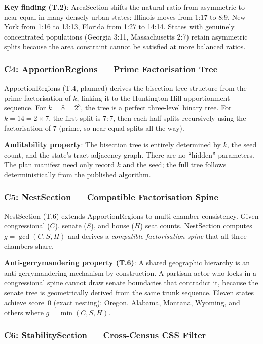 \textbf{Key finding (T.2)}: AreaSection shifts the natural ratio from asymmetric
to near-equal in many densely urban states: Illinois moves from 1:17 to 8:9,
New York from 1:16 to 13:13, Florida from 1:27 to 14:14.
States with genuinely concentrated populations (Georgia 3:11, Massachusetts 2:7)
retain asymmetric splits because the area constraint cannot be satisfied at
more balanced ratios.

\subsubsection*{C4: ApportionRegions --- Prime Factorisation Tree}

ApportionRegions (T.4, planned) derives the bisection tree structure from the
prime factorisation of $k$, linking it to the Huntington-Hill apportionment
sequence.
For $k = 8 = 2^3$, the tree is a perfect three-level binary tree.
For $k = 14 = 2 \times 7$, the first split is $7:7$, then each half splits
recursively using the factorisation of 7 (prime, so near-equal splits all the
way).

\textbf{Auditability property}: The bisection tree is entirely determined by
$k$, the seed count, and the state's tract adjacency graph.
There are no ``hidden'' parameters.
The plan manifest need only record $k$ and the seed; the full tree follows
deterministically from the published algorithm.

\subsubsection*{C5: NestSection --- Compatible Factorisation Spine}

NestSection (T.6) extends ApportionRegions to multi-chamber consistency.
Given congressional ($C$), senate ($S$), and house ($H$) seat counts,
NestSection computes $g = \gcd(C, S, H)$ and derives a \emph{compatible
factorisation spine} that all three chambers share.

\textbf{Anti-gerrymandering property (T.6)}: A shared geographic hierarchy
is an anti-gerrymandering mechanism by construction.
A partisan actor who locks in a congressional spine cannot draw senate boundaries
that contradict it, because the senate tree is geometrically derived from the
same trunk sequence.
Eleven states achieve score~0 (exact nesting): Oregon, Alabama, Montana, Wyoming,
and others where $g = \min(C, S, H)$.

\subsubsection*{C6: StabilitySection --- Cross-Census CSS Filter}

